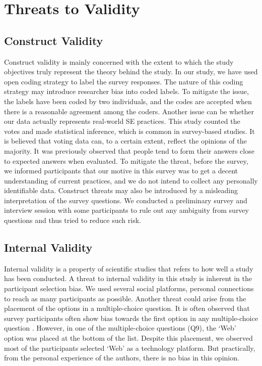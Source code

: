 \section{Threats to Validity}
\label{validity}

\subsection{Construct Validity}
Construct validity is mainly concerned with the extent to which the
study objectives truly represent the theory behind the study\cite{Wohlin2012}. In our study, we have used open coding strategy to label the survey responses. The nature of this coding strategy may introduce researcher bias into coded labels. To mitigate the issue, the labels have been coded by two individuals, and the codes are accepted when there is a reasonable agreement among the coders. Another issue can be whether our data actually represents real-world SE practices. This study counted the votes and made statistical inference, which is common in survey-based studies. It is believed that voting data can, to a certain extent, reflect the opinions of the majority. It was previously observed\cite{Garousi2015}  that people tend to form their answers close to expected answers when evaluated. To mitigate the threat, before the survey, we informed participants that our motive in this survey was to get a decent understanding of current practices, and we do not intend to collect any personally identifiable data. Construct threats may also be introduced by a misleading interpretation of the survey questions. We conducted a preliminary survey and interview session with some participants to rule out any ambiguity from survey questions and thus tried to reduce such risk.

\subsection{Internal Validity}
Internal validity is a property of scientific studies that refers to how well a study has been conducted. A threat to internal validity in this study is inherent in the participant selection bias. We used several social platforms, personal connections to reach as many participants as possible. Another threat could arise from the placement of the options in a multiple-choice question. It is often observed that survey participants often show bias towards the first option in any multiple-choice question\cite{Uddin2019} . However, in one of the multiple-choice questions (Q9), the `Web' option was placed at the bottom of the list. Despite this placement, we observed most of the participants selected `Web' as a technology platform. But practically, from the personal experience of the authors, there is no bias in this opinion.


